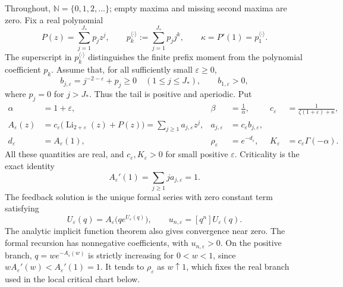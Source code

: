 \documentclass[11pt,a4paper]{article}
\theoremstyle{definition}\newtheorem{definition}[theorem]{Definition}
\theoremstyle{remark}\newtheorem{remark}[theorem]{Remark}
\newcommand{\eps}{\varepsilon}
\newcommand{\Li}{\operatorname{Li}}
\newcommand{\N}{\mathbb N}
\newcommand{\1}{\mathbf 1}
\begin{document}
Throughout, $\N=\{0,1,2,\ldots\}$; empty maxima and missing second maxima are zero.
Fix a real polynomial
\begin{equation}\label{eq:P}
 P(z)=\sum_{j=1}^{J_*}p_jz^j,\qquad
 p_k^{\langle\cdot\rangle}:=\sum_{j=1}^{J_*}p_jj^k,
 \qquad \kappa=P'(1)=p_1^{\langle\cdot\rangle}.
\end{equation}
The superscript in $p_k^{\langle\cdot\rangle}$ distinguishes the finite
prefix moment from the polynomial coefficient $p_k$. Assume that, for
all sufficiently small $\eps\ge0$,
\begin{equation}\label{eq:positive}
 b_{j,\eps}=j^{-2-\eps}+p_j\ge0\quad(1\le j\le J_*),
 \qquad b_{1,\eps}>0,
\end{equation}
where $p_j=0$ for $j>J_*$. Thus the tail is positive and aperiodic. Put
\begin{align}
 \alpha&=1+\eps,& \beta&=\frac1\alpha,&
 c_{\eps}&=\frac1{\zeta(1+\eps)+\kappa},\label{eq:parameters1}\\
 A_{\eps}(z)&=c_{\eps}\bigl(\Li_{2+\eps}(z)+P(z)\bigr)
             =\sum_{j\ge1}a_{j,\eps}z^j,&
 a_{j,\eps}&=c_{\eps}b_{j,\eps},\label{eq:parameters2}\\
 d_{\eps}&=A_{\eps}(1),&
 \rho_{\eps}&=e^{-d_{\eps}},&
 K_{\eps}&=c_{\eps}\Gamma(-\alpha).
 \label{eq:parameters3}
\end{align}
All these quantities are real, and $c_{\eps},K_{\eps}>0$ for small
positive $\eps$. Criticality is the exact identity
\begin{equation}\label{eq:criticality}
 A_{\eps}'(1)=\sum_{j\ge1}j a_{j,\eps}=1.
\end{equation}
The feedback solution is the unique formal series with zero constant
term satisfying
\begin{equation}\label{eq:feedback}
 U_{\eps}(q)=A_{\eps}\bigl(qe^{U_{\eps}(q)}\bigr),
 \qquad u_{n,\eps}=[q^n]U_{\eps}(q).
\end{equation}
The analytic implicit function theorem also gives convergence near zero.
The formal recursion has nonnegative coefficients, with $u_{n,\eps}>0$.
On the positive branch, $q=w e^{-A_{\eps}(w)}$ is strictly increasing
for $0<w<1$, since $wA_{\eps}'(w)<A_{\eps}'(1)=1$.
It tends to $\rho_{\eps}$ as $w\uparrow1$, which fixes the real
branch used in the local critical chart below.
\end{document}
